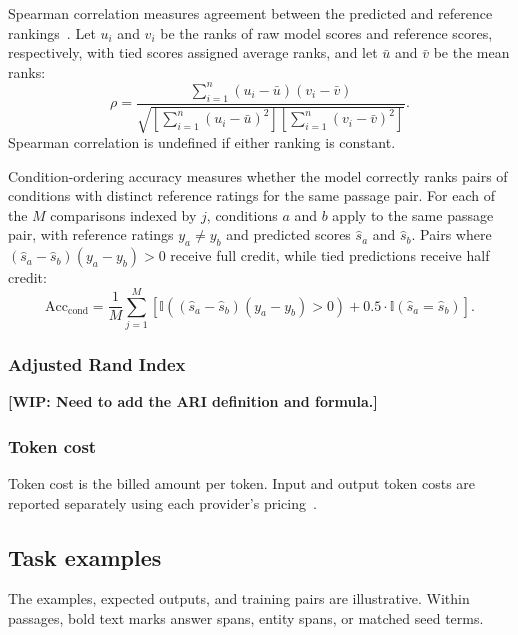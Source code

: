 \documentclass{article}
\begin{document}
Spearman correlation measures agreement between the predicted and reference rankings~\cite{C-STS}. Let \(u_i\) and \(v_i\) be the ranks of raw model scores and reference scores, respectively, with tied scores assigned average ranks, and let \(\bar{u}\) and \(\bar{v}\) be the mean ranks:
\[
\rho =
\frac{\sum_{i=1}^{n}(u_i-\bar{u})(v_i-\bar{v})}
{\sqrt{\left[\sum_{i=1}^{n}(u_i-\bar{u})^2\right]
\left[\sum_{i=1}^{n}(v_i-\bar{v})^2\right]}}.
\]
Spearman correlation is undefined if either ranking is constant.

Condition-ordering accuracy measures whether the model correctly ranks pairs of conditions with distinct reference ratings for the same passage pair. For each of the \(M\) comparisons indexed by \(j\), conditions \(a\) and \(b\) apply to the same passage pair, with reference ratings \(y_a \neq y_b\) and predicted scores \(\hat{s}_a\) and \(\hat{s}_b\). Pairs where \((\hat{s}_a - \hat{s}_b)(y_a - y_b) > 0\) receive full credit, while tied predictions receive half credit:
\[
\mathrm{Acc}_{\mathrm{cond}} = \frac{1}{M}\sum_{j=1}^{M} \left[ \mathbb{I}\left((\hat{s}_a - \hat{s}_b)(y_a - y_b) > 0\right) + 0.5 \cdot \mathbb{I}\left(\hat{s}_a = \hat{s}_b\right) \right].
\]

\subsubsection{Adjusted Rand Index}
\label{app:ari}
\noindent\textbf{[WIP: Need to add the ARI definition and formula.]}\par\smallskip

\subsubsection{Token cost}
\label{app:cost}
Token cost is the billed amount per token. Input and output token costs are reported separately using each provider's pricing~\cite{ModelDocs}.

\subsection{Task examples}
\label{app:examples}
The examples, expected outputs, and training pairs are illustrative. Within passages, bold text marks answer spans, entity spans, or matched seed terms.
\end{document}
